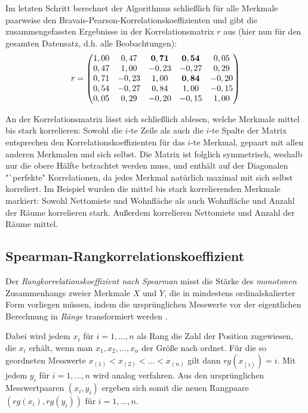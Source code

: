 \noindent Im letzten Schritt berechnet der Algorithmus schließlich für alle Merkmale paarweise den Bravais-Pearson-Korrelationskoeffizienten und gibt die zusammengefassten Ergebnisse in der Korrelationsmatrix $r$ aus (hier nun für den gesamten Datensatz, d.h. alle Beobachtungen):
\begin{equation*}
	r =
	\begin{pmatrix}
		1,00 & 0,47 & {\bf 0,71} & {\bf 0,54} & 0,05\\
 		0,47 & 1,00 & -0,23 & -0,27 & 0,29\\
 		0,71 & -0,23 & 1,00 & {\bf 0,84} & -0,20\\
		0,54 & -0,27 & 0,84 & 1,00 & -0,15\\
  		0,05 &  0,29 & -0,20 & -0,15 & 1,00\\
	\end{pmatrix}
\end{equation*}

\noindent An der Korrelationsmatrix lässt sich schließlich ablesen, welche Merkmale mittel bis stark korrelieren: Sowohl die $i$-te Zeile als auch die $i$-te Spalte der Matrix  entsprechen den Korrelationskoeffizienten für das $i$-te Merkmal, gepaart mit allen anderen Merkmalen und sich selbst. Die Matrix ist folglich symmetrisch, weshalb nur die obere Hälfte betrachtet werden muss, und enthält auf der Diagonalen "`perfekte" Korrelationen, da jedes Merkmal natürlich maximal mit sich selbst korreliert. Im Beispiel wurden die mittel bis stark korrelierenden Merkmale markiert: Sowohl Nettomiete und Wohnfläche als auch Wohnfläche und Anzahl der Räume korrelieren stark. Außerdem korrelieren Nettomiete und Anzahl der Räume mittel.

\subsection{Spearman-Rangkorrelationskoeffizient}

Der {\it Rangkorrelationskoeffizient nach Spearman} misst die Stärke des {\it monotonen} Zusammenhangs zweier Merkmale $X$ und $Y$, die in mindestens ordinalskalierter Form vorliegen müssen, indem die ursprünglichen Messwerte vor der eigentlichen Berechnung in {\it Ränge} transformiert werden \cite{Fahrmeir2010}.

Dabei wird jedem $x_i$ für $i=1,...,n$ als Rang die Zahl der Position zugewiesen, die $x_i$ erhält, wenn man $x_1, x_2, ..., x_n$ der Größe nach ordnet. Für die so geordneten Messwerte $x_{(1)}<x_{(2)}<...<x_{(n)}$ gilt dann $rg(x_{(i)})=i$. Mit jedem $y_i$ für $i=1,...,n$ wird analog verfahren. Aus den ursprünglichen Messwertpaaren $(x_i, y_i)$ ergeben sich somit die neuen Rangpaare $(rg(x_i), rg(y_i))$ für $i=1,...,n$.

